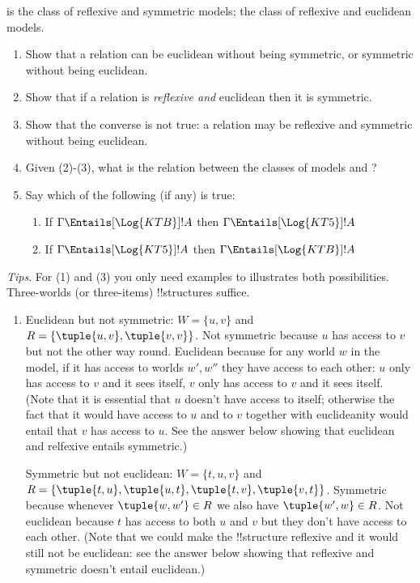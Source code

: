 \documentclass[../../../../include/open-logic-section]{subfiles}
\begin{document}
\begin{prob}

 is the class of reflexive and symmetric models;  
the class of reflexive and euclidean models. 
\begin{enumerate}
	\item Show that a relation can be euclidean 
	without being symmetric, or symmetric without being euclidean. 
	\item Show that if a relation is \emph{reflexive and} euclidean then
	it is symmetric. 
	\item Show that the converse is not true: a relation may be reflexive
	and symmetric without being euclidean.
	\item Given (2)-(3), what is the relation between the classes of 
	models  and ?
	\item Say which of the following (if any) is true: 
	\begin{enumerate}
		\item If $\Gamma \Entails[\Log{KTB}] !A$ then $\Gamma \Entails[\Log{KT5}] !A$ 
		\item If $\Gamma \Entails[\Log{KT5}] !A$ then $\Gamma \Entails[\Log{KTB}] !A$ 
	\end{enumerate}	
\end{enumerate}	

\emph{Tips}. For (1) and (3) you only need examples to illustrates both possibilities. 
	Three-worlds (or three-items) !!{structure}s suffice.

	\begin{ans}
	\begin{enumerate}
		\item Euclidean but not symmetric: $W=\{u,v\}$ and
		$R=\{\tuple{u,v},\tuple{v,v}\}$. Not symmetric because $u$ has
		access to $v$ but not the other way round. Euclidean because
		for any world $w$ in the model, if it has access to worlds
		$w',w''$ they have access to each other: $u$ only has access
		to $v$ and it sees itself, $v$ only has access to $v$ and it
		sees itself. (Note that it is essential that $u$ doesn't have 
		access to itself; otherwise the fact that it would have access
		to $u$ and to $v$ together with euclideanity would entail that 
		$v$ has access to $u$. See the answer below showing that 
		euclidean and relfexive entails symmetric.)
		
		Symmetric but not euclidean: $W=\{t,u,v\}$ and
		$R=\{\tuple{t,u},\tuple{u,t},\tuple{t,v},\tuple{v,t}\}$.
		Symmetric because whenever $\tuple{w,w'}\in R$ we also have
		$\tuple{w',w}\in R$. Not euclidean because $t$ has access to
		both $u$ and $v$ but they don't have access to each other.
		(Note that we could make the !!{structure} reflexive and it
		would still not be euclidean: see the answer below showing
		that reflexive and symmetric doesn't entail euclidean.)


\end{enumerate}
\end{ans}
\end{prob}
\end{document}
